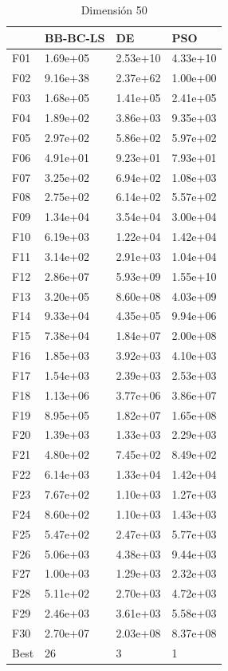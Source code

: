 \begin{table}[H]
    \begin{minipage}{.5\linewidth}
      \caption{Dimensión 50}
      \centering
      \begin{tabular}{llll}
        \toprule
        {} &  BB-BC-LS &        DE &       PSO \\
        \midrule
        F01  &  1.69e+05 &  2.53e+10 &  4.33e+10 \\
        F02  &  9.16e+38 &  2.37e+62 &  1.00e+00 \\
        F03  &  1.68e+05 &  1.41e+05 &  2.41e+05 \\
        F04  &  1.89e+02 &  3.86e+03 &  9.35e+03 \\
        F05  &  2.97e+02 &  5.86e+02 &  5.97e+02 \\
        F06  &  4.91e+01 &  9.23e+01 &  7.93e+01 \\
        F07  &  3.25e+02 &  6.94e+02 &  1.08e+03 \\
        F08  &  2.75e+02 &  6.14e+02 &  5.57e+02 \\
        F09  &  1.34e+04 &  3.54e+04 &  3.00e+04 \\
        F10  &  6.19e+03 &  1.22e+04 &  1.42e+04 \\
        F11  &  3.14e+02 &  2.91e+03 &  1.04e+04 \\
        F12  &  2.86e+07 &  5.93e+09 &  1.55e+10 \\
        F13  &  3.20e+05 &  8.60e+08 &  4.03e+09 \\
        F14  &  9.33e+04 &  4.35e+05 &  9.94e+06 \\
        F15  &  7.38e+04 &  1.84e+07 &  2.00e+08 \\
        F16  &  1.85e+03 &  3.92e+03 &  4.10e+03 \\
        F17  &  1.54e+03 &  2.39e+03 &  2.53e+03 \\
        F18  &  1.13e+06 &  3.77e+06 &  3.86e+07 \\
        F19  &  8.95e+05 &  1.82e+07 &  1.65e+08 \\
        F20  &  1.39e+03 &  1.33e+03 &  2.29e+03 \\
        F21  &  4.80e+02 &  7.45e+02 &  8.49e+02 \\
        F22  &  6.14e+03 &  1.33e+04 &  1.42e+04 \\
        F23  &  7.67e+02 &  1.10e+03 &  1.27e+03 \\
        F24  &  8.60e+02 &  1.10e+03 &  1.43e+03 \\
        F25  &  5.47e+02 &  2.47e+03 &  5.77e+03 \\
        F26  &  5.06e+03 &  4.38e+03 &  9.44e+03 \\
        F27  &  1.00e+03 &  1.29e+03 &  2.32e+03 \\
        F28  &  5.11e+02 &  2.70e+03 &  4.72e+03 \\
        F29  &  2.46e+03 &  3.61e+03 &  5.58e+03 \\
        F30  &  2.70e+07 &  2.03e+08 &  8.37e+08 \\
        Best &        26 &         3 &         1 \\
        \bottomrule
        \end{tabular}
        

\end{minipage}
\end{table}

